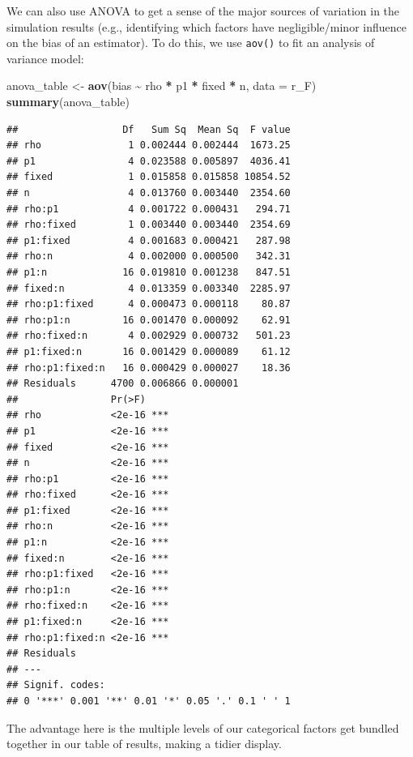 \documentclass[
]{book}
\newenvironment{Shaded}{\begin{snugshade}}{\end{snugshade}}
\newcommand{\AttributeTok}[1]{\textcolor[rgb]{0.13,0.29,0.53}{#1}}
\newcommand{\FunctionTok}[1]{\textcolor[rgb]{0.13,0.29,0.53}{\textbf{#1}}}
\newcommand{\NormalTok}[1]{#1}
\newcommand{\OtherTok}[1]{\textcolor[rgb]{0.56,0.35,0.01}{#1}}
\newcommand{\SpecialCharTok}[1]{\textcolor[rgb]{0.81,0.36,0.00}{\textbf{#1}}}
\begin{document}
We can also use ANOVA to get a sense of the major sources of variation in the simulation results (e.g., identifying which factors have negligible/minor influence on the bias of an estimator).
To do this, we use \texttt{aov()} to fit an analysis of variance model:

\begin{Shaded}
\begin{Highlighting}[]
\NormalTok{anova\_table }\OtherTok{\textless{}{-}} \FunctionTok{aov}\NormalTok{(bias }\SpecialCharTok{\textasciitilde{}}\NormalTok{ rho }\SpecialCharTok{*}\NormalTok{ p1 }\SpecialCharTok{*}\NormalTok{ fixed }\SpecialCharTok{*}\NormalTok{ n, }\AttributeTok{data =}\NormalTok{ r\_F)}
\FunctionTok{summary}\NormalTok{(anova\_table)}
\end{Highlighting}
\end{Shaded}

\begin{verbatim}
##                  Df   Sum Sq  Mean Sq  F value
## rho               1 0.002444 0.002444  1673.25
## p1                4 0.023588 0.005897  4036.41
## fixed             1 0.015858 0.015858 10854.52
## n                 4 0.013760 0.003440  2354.60
## rho:p1            4 0.001722 0.000431   294.71
## rho:fixed         1 0.003440 0.003440  2354.69
## p1:fixed          4 0.001683 0.000421   287.98
## rho:n             4 0.002000 0.000500   342.31
## p1:n             16 0.019810 0.001238   847.51
## fixed:n           4 0.013359 0.003340  2285.97
## rho:p1:fixed      4 0.000473 0.000118    80.87
## rho:p1:n         16 0.001470 0.000092    62.91
## rho:fixed:n       4 0.002929 0.000732   501.23
## p1:fixed:n       16 0.001429 0.000089    61.12
## rho:p1:fixed:n   16 0.000429 0.000027    18.36
## Residuals      4700 0.006866 0.000001         
##                Pr(>F)    
## rho            <2e-16 ***
## p1             <2e-16 ***
## fixed          <2e-16 ***
## n              <2e-16 ***
## rho:p1         <2e-16 ***
## rho:fixed      <2e-16 ***
## p1:fixed       <2e-16 ***
## rho:n          <2e-16 ***
## p1:n           <2e-16 ***
## fixed:n        <2e-16 ***
## rho:p1:fixed   <2e-16 ***
## rho:p1:n       <2e-16 ***
## rho:fixed:n    <2e-16 ***
## p1:fixed:n     <2e-16 ***
## rho:p1:fixed:n <2e-16 ***
## Residuals                
## ---
## Signif. codes:  
## 0 '***' 0.001 '**' 0.01 '*' 0.05 '.' 0.1 ' ' 1
\end{verbatim}

The advantage here is the multiple levels of our categorical factors get bundled together in our table of results, making a tidier display.
\end{document}
